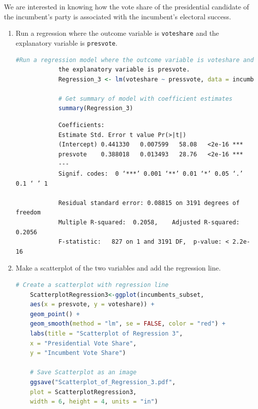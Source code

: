\documentclass[12pt,letterpaper]{article}
\begin{document}
\noindent We are interested in knowing how the vote share of the presidential candidate of the incumbent's party is associated with the incumbent's electoral success.
	\vspace{.25cm}
	\begin{enumerate}
		\item Run a regression where the outcome variable is \texttt{voteshare} and the explanatory variable is \texttt{presvote}.
			\vspace{0cm}
			
			\begin{lstlisting}[language=R, caption={Regression Model 3 in R}, label={lst:regression_model}]
			#Run a regression model where the outcome variable is voteshare and 
			the explanatory variable is presvote.
			Regression_3 <- lm(voteshare ~ pressvote, data = incumbents_subset)
				
			# Get summary of model with coefficient estimates
			summary(Regression_3)
			\end{lstlisting}
			
			\begin{verbatim}
			Coefficients:
			Estimate Std. Error t value Pr(>|t|)    
			(Intercept) 0.441330   0.007599   58.08   <2e-16 ***
			presvote    0.388018   0.013493   28.76   <2e-16 ***
			---
			Signif. codes:  0 ‘***’ 0.001 ‘**’ 0.01 ‘*’ 0.05 ‘.’ 0.1 ‘ ’ 1
			
			Residual standard error: 0.08815 on 3191 degrees of freedom
			Multiple R-squared:  0.2058,	Adjusted R-squared:  0.2056 
			F-statistic:   827 on 1 and 3191 DF,  p-value: < 2.2e-16
		\end{verbatim}
			
		\item Make a scatterplot of the two variables and add the regression line. 
			\vspace{1cm}
			
	\begin{lstlisting}[language=R, caption={Scatterplot 3 code in R}, label={lst:regression_model}]
	# Create a scatterplot with regression line
	ScatterplotRegression3<-ggplot(incumbents_subset, 
	aes(x = presvote, y = voteshare)) +
	geom_point() +
	geom_smooth(method = "lm", se = FALSE, color = "red") +
	labs(title = "Scatterplot of Regression 3",
	x = "Presidential Vote Share",
	y = "Incumbent Vote Share")
	
	# Save Scatterplot as an image
	ggsave("Scatterplot_of_Regression_3.pdf", 
	plot = ScatterplotRegression3, 
	width = 6, height = 4, units = "in")
	\end{lstlisting}		
			

\end{enumerate}
\end{document}
